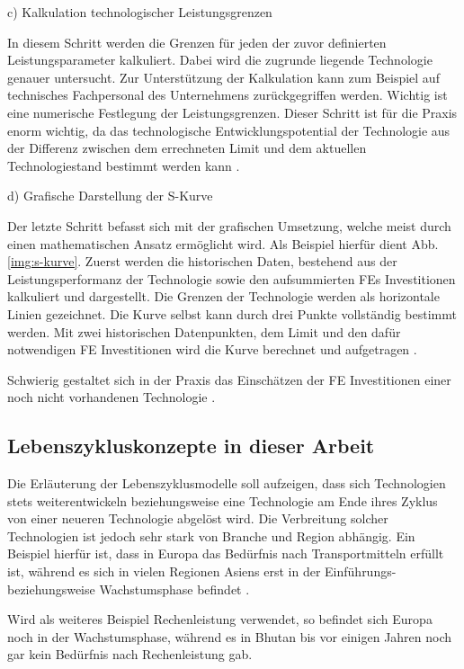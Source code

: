 c) Kalkulation technologischer Leistungsgrenzen

In diesem Schritt werden die Grenzen für jeden der zuvor definierten Leistungsparameter kalkuliert. Dabei wird die zugrunde liegende Technologie genauer untersucht. Zur Unterstützung der Kalkulation kann zum Beispiel auf technisches Fachpersonal des Unternehmens zurückgegriffen werden. Wichtig ist eine numerische Festlegung der Leistungsgrenzen. Dieser Schritt ist für die Praxis enorm wichtig, da das technologische Entwicklungspotential der Technologie aus der Differenz zwischen dem errechneten Limit und dem aktuellen Technologiestand bestimmt werden kann \cite{Bru06}.

d) Grafische Darstellung der S-Kurve

Der letzte Schritt befasst sich mit der grafischen Umsetzung, welche meist durch einen mathematischen Ansatz ermöglicht wird. Als Beispiel hierfür dient Abb. \ref{img:s-kurve}. Zuerst werden die historischen Daten, bestehend aus der Leistungsperformanz der Technologie sowie den aufsummierten \acp{FE} Investitionen kalkuliert und dargestellt. Die Grenzen der Technologie werden als horizontale Linien gezeichnet. Die Kurve selbst kann durch drei Punkte vollständig bestimmt werden. Mit zwei historischen Datenpunkten, dem Limit und den dafür notwendigen \ac{FE} Investitionen wird die Kurve berechnet und aufgetragen \cite{Bru06}.

Schwierig gestaltet sich in der Praxis das Einschätzen der \ac{FE} Investitionen einer noch nicht vorhandenen Technologie \cite{Bru06}.

\subsection{Lebenszykluskonzepte in dieser Arbeit}

Die Erläuterung der Lebenszyklusmodelle soll aufzeigen, dass sich Technologien stets weiterentwickeln beziehungsweise eine Technologie am Ende ihres Zyklus von einer neueren Technologie abgelöst wird. Die Verbreitung solcher Technologien ist jedoch sehr stark von Branche und Region abhängig. Ein Beispiel hierfür ist, dass in Europa das Bedürfnis nach Transportmitteln erfüllt ist, während es sich in vielen Regionen Asiens erst in der Einführungs- beziehungsweise Wachstumsphase befindet \cite{Bru06}. 

Wird als weiteres Beispiel Rechenleistung verwendet, so befindet sich Europa noch in der Wachstumsphase, während es in Bhutan bis vor einigen Jahren noch gar kein Bedürfnis nach Rechenleistung gab. 

